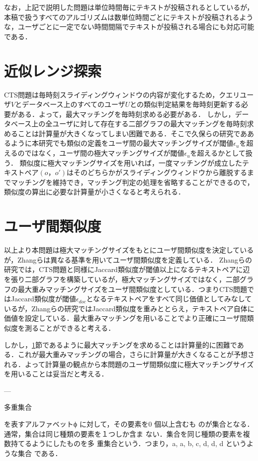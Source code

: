なお，上記で説明した問題は単位時間毎にテキストが投稿されるとしているが，本稿で扱うすべてのアルゴリズムは数単位時間ごとにテキストが投稿されるような，ユーザごとに一定でない時間間隔でテキストが投稿される場合にも対応可能である．

\section{近似レンジ探索}\label{kinjirange}
CTS問題は毎時刻スライディングウィンドウの内容が変化するため，クエリユーザ$V$とデータベース上のすべてのユーザ$U$との類似判定結果を毎時刻更新する必要がある．よって，最大マッチングを毎時刻求める必要がある．
しかし，データベース上の全ユーザに対して存在する二部グラフの最大マッチングを毎時刻求めることは計算量が大きくなってしまい困難である．そこで久保ら\cite{kubo}の研究でああるように本研究でも類似の定義をユーザ間の最大マッチングサイズが閾値$\epsilon_u$を超えるのではなく，ユーザ間の極大マッチングサイズが閾値$\epsilon_u$を超えるかとして扱う．
類似度に極大マッチングサイズを用いれば，一度マッチングが成立したテキストペア$(o，o')$はそのどちらかがスライディングウィンドウから離脱するまでマッチングを維持でき，マッチング判定の処理を省略することができるので，類似度の算出に必要な計算量が小さくなると考えられる．


\section{ユーザ間類似度}
以上より本問題は極大マッチングサイズをもとにユーザ間類似度を決定しているが，Zhangら\cite{zhang2021clustering}は異なる基準を用いてユーザ間類似度を定義している．
Zhangらの研究では，CTS問題と同様にJaccard類似度が閾値以上になるテキストペアに辺を張り二部グラフを構築しているが，極大マッチングサイズではなく，二部グラフの最大重みマッチングサイズをユーザ間類似度としている．つまりCTS問題ではJaccard類似度が閾値$\epsilon_{doc}$となるテキストペアをすべて同じ価値としてみなしているが，Zhangらの研究ではJaccard類似度を重みととらえ，テキストペア自体に価値を設定している．最大重みマッチングを用いることでより正確にユーザ間類似度を測ることができると考える．

しかし，\ref{kinjirange}節であるように最大マッチングを求めることは計算量的に困難である．これが最大重みマッチングの場合，さらに計算量が大きくなることが予想される．よって計算量の観点から本問題のユーザ間類似度に極大マッチングサイズを用いることは妥当だと考える．

---

多重集合

を表すアルファベットϕ に対して，その要素を0 個以上含むも
のが集合となる．通常，集合は同じ種類の要素を１つしか含ま
ない．集合を同じ種類の要素を複数持てるようにしたものを多
重集合という．つまり，{a, a, b, c, d, d, d} というような集合
である．

